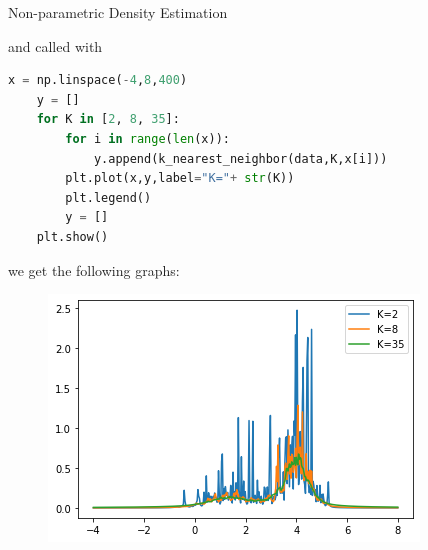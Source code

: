 \documentclass[
ngerman,
]{tudaexercise}
\begin{document}
\begin{task}{Non-parametric Density Estimation}
\begin{subtask}
	and called with 
	\begin{lstlisting}[language=Python]
	x = np.linspace(-4,8,400)
	y = []
	for K in [2, 8, 35]:
		for i in range(len(x)):
			y.append(k_nearest_neighbor(data,K,x[i]))
		plt.plot(x,y,label="K="+ str(K))
		plt.legend()
		y = []
	plt.show()
	\end{lstlisting}
	we get the following graphs:
	\begin{figure}[H]
		\includegraphics{3cplot.png}
	\end{figure}
	\end{subtask}
\end{task}
	
\end{document}
